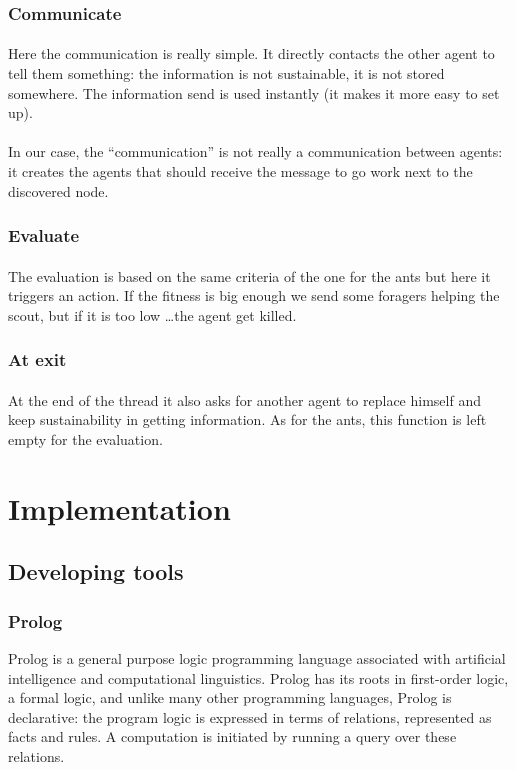 \documentclass{article}
\begin{document}
		\subsubsection{Communicate}
			\paragraph{}
				Here the communication is really simple.
				It directly contacts the other agent to tell them something:
				the information is not sustainable, it is not stored somewhere.
				The information send is used instantly (it makes it more easy to set up).
			\paragraph{}
				In our case, the ``communication'' is not really a communication between agents:
				it creates the agents that should receive the message to go work next to the discovered node.
		\subsubsection{Evaluate}
			\paragraph{}
				The evaluation is based on the same criteria of the one for the ants but here it triggers an action.
				If the fitness is big enough we send some foragers helping the scout, but if it is too low \dots the agent get killed.
		\subsubsection{At exit}
			\paragraph{}
				At the end of the thread it also asks for another agent to replace himself and keep sustainability in getting information.
				As for the ants, this function is left empty for the evaluation.

\section{Implementation}
	\subsection{Developing tools}
		\subsubsection{Prolog}
			Prolog is a general purpose logic programming language associated with artificial intelligence and computational linguistics.
			Prolog has its roots in first-order logic, a formal logic, and unlike many other programming languages,
			Prolog is declarative: the program logic is expressed in terms of relations, represented as facts and rules.
			A computation is initiated by running a query over these relations.
\end{document}
